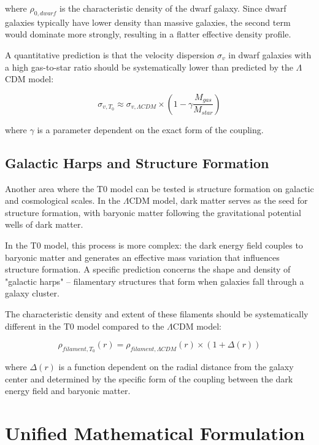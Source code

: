 \documentclass[a4paper,12pt]{article}
\begin{document}
	where $\rho_{0,dwarf}$ is the characteristic density of the dwarf galaxy. Since dwarf galaxies typically have lower density than massive galaxies, the second term would dominate more strongly, resulting in a flatter effective density profile.
	
	A quantitative prediction is that the velocity dispersion $\sigma_v$ in dwarf galaxies with a high gas-to-star ratio should be systematically lower than predicted by the $\Lambda$CDM model:
	
	\begin{equation}
		\sigma_{v,T_0} \approx \sigma_{v,\Lambda CDM} \times \left(1 - \gamma \frac{M_{gas}}{M_{star}}\right)
	\end{equation}
	
	where $\gamma$ is a parameter dependent on the exact form of the coupling.
	
	\subsection{Galactic Harps and Structure Formation}
	
	Another area where the T0 model can be tested is structure formation on galactic and cosmological scales. In the $\Lambda$CDM model, dark matter serves as the seed for structure formation, with baryonic matter following the gravitational potential wells of dark matter.
	
	In the T0 model, this process is more complex: the dark energy field couples to baryonic matter and generates an effective mass variation that influences structure formation. A specific prediction concerns the shape and density of "galactic harps" – filamentary structures that form when galaxies fall through a galaxy cluster.
	
	The characteristic density and extent of these filaments should be systematically different in the T0 model compared to the $\Lambda$CDM model:
	
	\begin{equation}
		\rho_{filament,T_0}(r) = \rho_{filament,\Lambda CDM}(r) \times \left(1 + \Delta(r)\right)
	\end{equation}
	
	where $\Delta(r)$ is a function dependent on the radial distance from the galaxy center and determined by the specific form of the coupling between the dark energy field and baryonic matter.
	
	\section{Unified Mathematical Formulation}
	
\end{document}
